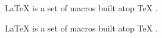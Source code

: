 \documentclass[12pt, a4paper]{article}
\begin{document}
\LaTeX{} \cite{lamport94} is a set of macros built atop \TeX{} \cite{texbook}.


\LaTeX{} \cite{latex2e} is a set of macros built atop \TeX{} \cite{texbook}.

\printbibliography
\end{document}
